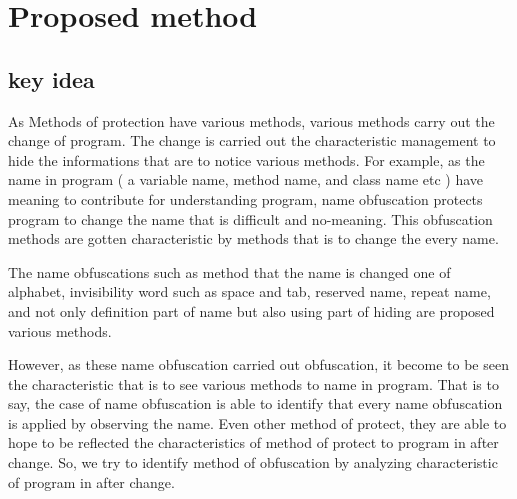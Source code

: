 \documentclass[conference]{IEEEtran}
\begin{document}
\section{Proposed method}

\subsection{key idea}

As Methods of protection have various methods, various methods carry
out the change of program.  The change is carried out the
characteristic management to hide the informations that are to notice
various methods.  For example, as the name in program ( a variable
name, method name, and class name etc ) have meaning to contribute for
understanding program, name obfuscation\cite{tyma00patent} protects
program to change the name that is difficult and no-meaning.  This
obfuscation methods are gotten characteristic by methods that is to
change the every name.

The name obfuscations such as method that the name is changed one of
alphabet, invisibility word such as space and tab, reserved name,
repeat name\cite{dasho}, and not only definition part of name but also
using part of hiding are proposed various methods\cite{tamada07ieice}.

However, as these name obfuscation carried out obfuscation, it become
to be seen the characteristic that is to see various methods to name
in program.  That is to say, the case of name obfuscation is able to
identify that every name obfuscation is applied by observing the name.
Even other method of protect, they are able to hope to be reflected
the characteristics of method of protect to program in after change.
So, we try to identify method of obfuscation by analyzing
characteristic of program in after change.
\end{document}
